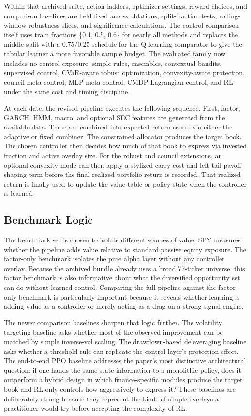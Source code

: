 \documentclass[10pt,twocolumn]{article}
\begin{document}
Within that archived suite, action ladders, optimizer settings, reward choices,
and comparison baselines are held fixed across ablations, split-fraction tests,
rolling-window robustness slices, and significance calculations. The control
comparison itself uses train fractions \{0.4, 0.5, 0.6\} for nearly all methods
and replaces the middle split with a 0.75/0.25 schedule for the Q-learning
comparator to give the tabular learner a more favorable sample budget. The
evaluated family now includes no-control exposure, simple rules, ensembles,
contextual bandits, supervised control, CVaR-aware robust optimization,
convexity-aware protection, council meta-control, MLP meta-control,
CMDP-Lagrangian control, and RL under the same cost and timing discipline.

At each date, the revised pipeline executes the following sequence. First,
factor, GARCH, HMM, macro, and optional SEC features are generated from the
available data. These are combined into expected-return scores via either the
adaptive or fixed combiner. The constrained allocator produces the target book.
The chosen controller then decides how much of that book to express via
invested fraction and active overlay size. For the robust and council
extensions, an optional convexity mode can then apply a stylized carry cost and
left-tail payoff shaping term before the final realized portfolio return is
recorded. That realized return is finally used to update the value table or
policy state when the controller is learned.

\subsection{Benchmark Logic}

The benchmark set is chosen to isolate different sources of value. SPY measures
whether the pipeline adds value relative to standard passive equity exposure.
The factor-only benchmark isolates the pure alpha layer without any controller
overlay. Because the archived bundle already uses a broad 77-ticker universe,
this factor benchmark is also informative about what the diversified opportunity
set can do without learned control. Comparing the full pipeline against the
factor-only benchmark is particularly important because it reveals whether
learning is adding value as a controller or merely acting as a drag on a strong
signal engine.

The newer comparison baselines sharpen that logic further. The volatility
targeting baseline asks whether most of the observed improvement can be matched
by simple inverse-vol scaling. The drawdown-based deleveraging baseline asks
whether a threshold rule can replicate the control layer's protection effect.
The end-to-end PPO baseline addresses the paper's most distinctive
architectural question: if one hands the same state information to a monolithic
policy, does it outperform a hybrid design in which finance-specific modules
produce the target book and RL only controls how aggressively to express it?
These baselines are deliberately strong because they represent the kinds of
simple overlays a practitioner would try before accepting the complexity of RL.
\end{document}
